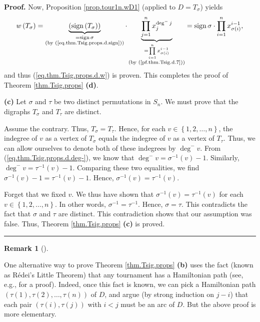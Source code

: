 \documentclass[numbers=enddot,12pt,final,onecolumn,notitlepage]{scrartcl}%
\numberwithin{exer}{subsection}
\theoremstyle{definition}
\newtheorem{remk}[theo]{Remark}
\newenvironment{remark}[1][]
{\begin{remk}[#1]\begin{leftbar}}
{\end{leftbar}\end{remk}}
\newenvironment{proof}[1][Proof]{\noindent\textbf{#1.} }{\ \rule{0.5em}{0.5em}}
\let\prodnonlimits\prod
\renewcommand{\prod}{\prodnonlimits\limits}
\begin{document}
\begin{proof}
Now, Proposition \ref{prop.tour1n.wD1} (applied to $D=T_{\sigma}$) yields%
\[
w\left(  T_{\sigma}\right)  =\underbrace{\left(  \operatorname*{sign}\left(
T_{\sigma}\right)  \right)  }_{\substack{=\operatorname*{sign}\sigma
\\\text{(by (\ref{eq.thm.Tsig.props.d.sign}))}}}\cdot\underbrace{\prod
_{j=1}^{n}x_{j}^{\deg^{-}j}}_{\substack{=\prod_{i=1}^{n}x_{\sigma\left(
i\right)  }^{i-1}\\\text{(by (\ref{pf.thm.Tsig.d.7}))}}}=\operatorname*{sign}%
\sigma\cdot\prod_{i=1}^{n}x_{\sigma\left(  i\right)  }^{i-1},
\]
and thus (\ref{eq.thm.Tsig.props.d.w}) is proven. This completes the proof of
Theorem \ref{thm.Tsig.props} \textbf{(d)}. \medskip

\textbf{(c)} Let $\sigma$ and $\tau$ be two distinct permutations in $S_{n}$.
We must prove that the digraphs $T_{\sigma}$ and $T_{\tau}$ are distinct.

Assume the contrary. Thus, $T_{\sigma}=T_{\tau}$. Hence, for each
$v\in\left\{  1,2,\ldots,n\right\}  $, the indegree of $v$ as a vertex of
$T_{\sigma}$ equals the indegree of $v$ as a vertex of $T_{\tau}$. Thus, we
can allow ourselves to denote both of these indegrees by $\deg^{-}v$. From
(\ref{eq.thm.Tsig.props.d.deg-}), we know that $\deg^{-}v=\sigma^{-1}\left(
v\right)  -1$. Similarly, $\deg^{-}v=\tau^{-1}\left(  v\right)  -1$. Comparing
these two equalities, we find $\sigma^{-1}\left(  v\right)  -1=\tau
^{-1}\left(  v\right)  -1$. Hence, $\sigma^{-1}\left(  v\right)  =\tau
^{-1}\left(  v\right)  $.

Forget that we fixed $v$. We thus have shown that $\sigma^{-1}\left(
v\right)  =\tau^{-1}\left(  v\right)  $ for each $v\in\left\{  1,2,\ldots
,n\right\}  $. In other words, $\sigma^{-1}=\tau^{-1}$. Hence, $\sigma=\tau$.
This contradicts the fact that $\sigma$ and $\tau$ are distinct. This
contradiction shows that our assumption was false. Thus, Theorem
\ref{thm.Tsig.props} \textbf{(c)} is proved.
\end{proof}

\begin{remark}
One alternative way to prove Theorem \ref{thm.Tsig.props} \textbf{(b)} uses
the fact (known as R\'{e}dei's Little Theorem) that any tournament has a
Hamiltonian path (see, e.g., \cite[Theorem 1.4.9]{lec7} for a proof). Indeed,
once this fact is known, we can pick a Hamiltonian path $\left(  \tau\left(
1\right)  ,\tau\left(  2\right)  ,\ldots,\tau\left(  n\right)  \right)  $ of
$D$, and argue (by strong induction on $j-i$) that each pair $\left(
\tau\left(  i\right)  ,\tau\left(  j\right)  \right)  $ with $i<j$ must be an
arc of $D$. But the above proof is more elementary.
\end{remark}
\end{document}
